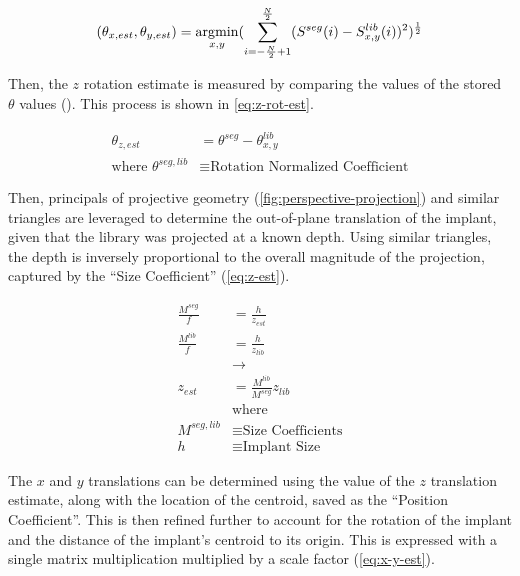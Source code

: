 \begin{equation}
    (\theta_{x,est},\theta_{y,est}) = \operatorname*{\arg\!min}_{x,y}(\sum_{i = -\frac{N}{2} + 1}^{\frac{N}{2}}(S^{seg}(i) - S^{lib}_{x,y}(i))^2)^{\frac{1}{2}}
    \label{eq:library-min}
\end{equation}

Then, the $z$ rotation estimate is measured by comparing the values of the stored $\theta$ values ().
This process is shown in \cref{eq:z-rot-est}.

\begin{equation}
    \begin{aligned}
        \theta_{z,est} &= \theta^{seg} - \theta^{lib}_{x,y}\\
        \text{where } \theta^{seg,lib} &\equiv \text{Rotation Normalized Coefficient}
    \end{aligned}
\label{eq:z-rot-est}
\end{equation}

Then, principals of projective geometry (\cref{fig:perspective-projection}) and similar triangles are leveraged to determine the out-of-plane translation of the implant, given that the library was projected at a known depth.
Using similar triangles, the depth is inversely proportional to the overall magnitude of the projection, captured by the ``Size Coefficient'' (\cref{eq:z-est}).

\begin{equation}
    \begin{aligned}
        \frac{M^{seg}}{f} &= \frac{h}{z_{est}}\\
        \frac{M^{lib}}{f} &= \frac{h}{z_{lib}}\\
        & \rightarrow \\
        z_{est}& = \frac{M^{lib}}{M^{seg}}z_{lib} \\
        &\text{where }\\
        M^{seg,lib} &\equiv \text{Size Coefficients} \\
        h &\equiv \text{Implant Size}
    \end{aligned}
    \label{eq:z-est}
\end{equation}

The $x$ and $y$ translations can be determined using the value of the $z$ translation estimate, along with the location of the centroid, saved as the ``Position Coefficient''.
This is then refined further to account for the rotation of the implant and the distance of the implant's centroid to its origin.
This is expressed with a single matrix multiplication multiplied by a scale factor (\cref{eq:x-y-est}).

